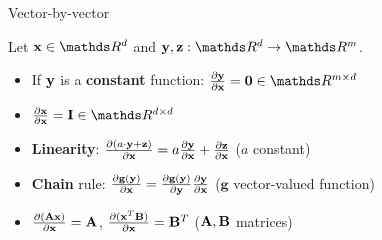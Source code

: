 \documentclass[11pt,compress,t,notes=noshow, xcolor=table]{beamer}
\begin{document}
\begin{vbframe}{Vector-by-vector}

Let $\xv \in \R^d$ and $\yv, \mathbf{z} : \R^d \to \R^m$.

\medskip

\begin{itemize}
    \item If $\mathbf{y}$ is a \textbf{constant} function: $\frac{\partial\yv}{\partial\xv} = \mathbf{0} \in \R^{m \times d}$
    \item $\frac{\partial \mathbf{x}}{\partial \mathbf{x}} = \mathbf{I} \in \R^{d \times d}$
    \item \textbf{Linearity}: $\frac{\partial (a \cdot \mathbf{y} + \mathbf{z})}{\partial\mathbf{x}} = a \frac{\partial\mathbf{y}}{\partial\mathbf{x}} + \frac{\partial\mathbf{z}}{\partial\mathbf{x}}$ \quad ($a$ constant)
    \item \textbf{Chain} rule: $\frac{\partial\mathbf{g}(\mathbf{y})}{\partial\mathbf{x}} = \frac{\partial\mathbf{g}(\mathbf{y})}{\partial\mathbf{y}} \frac{\partial\mathbf{y}}{\partial\mathbf{x}}$ \quad ($\mathbf{g}$ vector-valued function)
    \item $\frac{\partial(\mathbf{A}\mathbf{x})}{\partial\mathbf{x}} = \mathbf{A}$, $\frac{\partial(\mathbf{x}^T\mathbf{B})}{\partial\mathbf{x}} = \mathbf{B}^T$ \quad ($\mathbf{A},\mathbf{B}$ matrices)
\end{itemize}

\end{vbframe}
\end{document}

